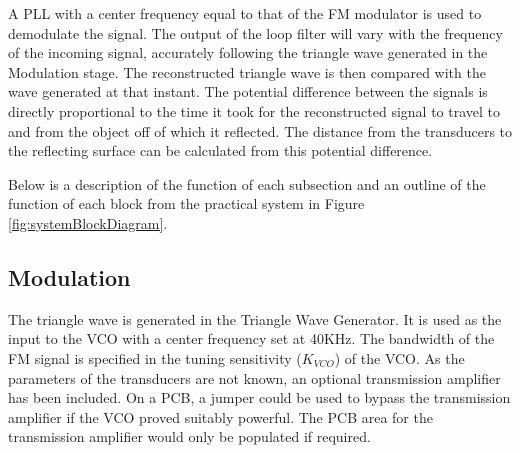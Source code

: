 A PLL with a center frequency equal to that of the FM modulator is used to demodulate the signal. 
The output of the loop filter will vary with the frequency of the incoming signal, accurately following the triangle wave generated in the Modulation stage. 
The reconstructed triangle wave is then compared with the wave generated at that instant. 
The potential difference between the signals is directly proportional to the time it took for the reconstructed signal to travel to and from the object off of which it reflected.
The distance from the transducers to the reflecting surface can be calculated from this potential difference. 

Below is a description of the function of each subsection and an outline of the function of each block from the practical system in Figure \ref{fig:systemBlockDiagram}. 

\subsection{Modulation}
The triangle wave is generated in the Triangle Wave Generator.
It is used as the input to the VCO with a center frequency set at 40KHz. 
The bandwidth of the FM signal is specified in the tuning sensitivity ($K_{VCO}$) of the VCO.
As the parameters of the transducers are not known, an optional transmission amplifier has been included.
On a PCB, a jumper could be used to bypass the transmission amplifier if the VCO proved suitably powerful. 
The PCB area for the transmission amplifier would only be populated if required. 

